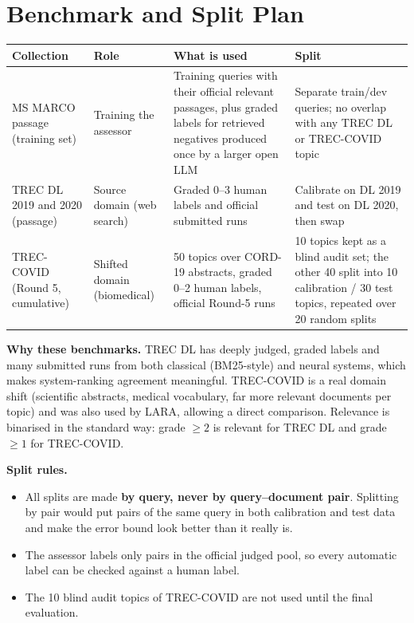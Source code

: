 \documentclass[11pt,a4paper]{article}
\begin{document}
\section{Benchmark and Split Plan}

\begin{table}[H]
\centering\small
\begin{tabularx}{\textwidth}{@{}P{3.1cm} P{2.2cm} Y Y@{}}
\toprule
\textbf{Collection} & \textbf{Role} & \textbf{What is used} & \textbf{Split} \\
\midrule
MS MARCO passage (training set) & Training the assessor & Training queries with their official relevant passages, plus graded labels for retrieved negatives produced once by a larger open LLM & Separate train/dev queries; no overlap with any TREC DL or TREC-COVID topic \\
TREC DL 2019 and 2020 (passage) & Source domain (web search) & Graded 0--3 human labels and official submitted runs & Calibrate on DL 2019 and test on DL 2020, then swap \\
TREC-COVID (Round 5, cumulative) & Shifted domain (biomedical) & 50 topics over CORD-19 abstracts, graded 0--2 human labels, official Round-5 runs & 10 topics kept as a blind audit set; the other 40 split into 10 calibration / 30 test topics, repeated over 20 random splits \\
\bottomrule
\end{tabularx}
\end{table}

\textbf{Why these benchmarks.} TREC DL has deeply judged, graded labels and many submitted runs from both classical (BM25-style) and neural systems, which makes system-ranking agreement meaningful. TREC-COVID is a real domain shift (scientific abstracts, medical vocabulary, far more relevant documents per topic) and was also used by LARA, allowing a direct comparison. Relevance is binarised in the standard way: grade $\ge2$ is relevant for TREC DL and grade $\ge1$ for TREC-COVID.

\textbf{Split rules.}
\begin{itemize}
  \item All splits are made \textbf{by query, never by query--document pair}. Splitting by pair would put pairs of the same query in both calibration and test data and make the error bound look better than it really is.
  \item The assessor labels only pairs in the official judged pool, so every automatic label can be checked against a human label.
  \item The 10 blind audit topics of TREC-COVID are not used until the final evaluation.
\end{itemize}
\end{document}
